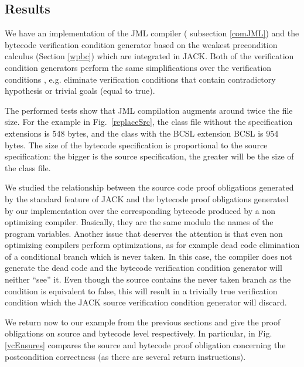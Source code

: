 
\subsection{Results}  \label{results}


We have an implementation of the JML compiler ( subsection \ref{comJML}) and the bytecode verification condition generator based on the weakest precondition calculus (Section \ref{wpbc}) which are integrated in JACK. Both of the verification condition generators perform the same simplifications over the verification conditions 
, e.g. eliminate verification conditions that contain contradictory hypothesis or trivial goals (equal to true). 

The performed tests show that JML compilation augments around twice the file size. 
For the example in Fig.~\ref{replaceSrc}, the class file without the specification extensions is 548 bytes, 
and the class with the BCSL extension BCSL is 954 bytes. 
The size of the bytecode specification is proportional to the source specification: 
the bigger is the source specification, the greater will be the size of the class file. 


We studied the relationship between the source code proof obligations generated 
by the standard feature of JACK and the bytecode proof obligations generated by our implementation over the corresponding bytecode
 produced by a non optimizing compiler. Basically, they are the same modulo the names of the program variables. Another issue that
 deserves the attention is that even non optimizing compilers perform optimizations, as for example dead code elimination of
 a conditional branch which is never taken.
In this case, the compiler does not generate the dead code and the bytecode verification condition generator will neither ``see'' it. 
Even though the source contains the never taken branch as the condition is equivalent to false, this will result in a trivially true
verification condition which the JACK source verification condition generator will discard.
%
%

 We return now to our example from the previous sections and give the proof obligations on source and bytecode level respectively. 
In particular, in Fig. \ref{vcEnsures} compares the source and bytecode proof obligation concerning the postcondition correctness (as there are several return instructions).

